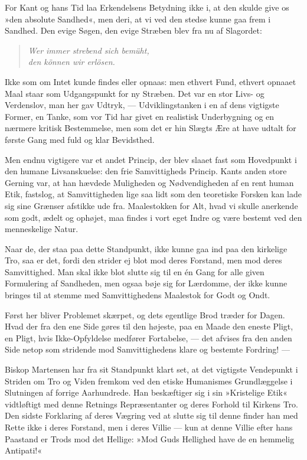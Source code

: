 \documentclass[12pt,a4paper]{article}
\newcommand{\apage}[1]{\marginnote{\footnotesize\textit{[#1]}}}
\begin{document}
For Kant og hans Tid laa Erkendelsens Betydning ikke i, at den skulde give
os »den absolute Sandhed«, men deri, at vi ved den stedse kunne gaa frem i
Sandhed. Den evige Søgen, den evige Stræben blev fra nu af Slagordet:

\begin{quote}
\itshape
Wer immer strebend sich bemüht,\\
den können wir erlösen.
\end{quote}

Ikke som om Intet kunde findes eller opnaas: men ethvert Fund, ethvert
opnaaet Maal staar som Udgangspunkt for ny Stræben. Det var en stor Livs-
og Verdenslov, man her gav Udtryk, --- Udviklingstanken i en af dens
vigtigste Former, en Tanke, som vor Tid har givet en realistisk Underbygning
og en nærmere kritisk Bestemmelse, men som det er hin Slægts Ære at have
udtalt for første Gang med fuld og klar Bevidsthed.

Men endnu vigtigere var et andet Princip, der blev slaaet fast som
Hovedpunkt i den humane Livsanskuelse: den frie Samvittigheds Princip.
Kants anden store Gerning var, at han hævdede Muligheden og Nødvendigheden
af en rent human Etik, fastslog, at Samvittigheden lige saa lidt som \apage{201} den
teoretiske Forsken kan lade sig sine Grænser afstikke ude fra. Maalestokken
for Alt, hvad vi skulle anerkende som godt, ædelt og ophøjet, maa findes i
vort eget Indre og være bestemt ved den menneskelige Natur.

Naar de, der staa paa dette Standpunkt, ikke kunne gaa ind paa den kirkelige
Tro, saa er det, fordi den strider ej blot mod deres Forstand, men mod deres
Samvittighed. Man skal ikke blot slutte sig til en én Gang for alle given
Formulering af Sandheden, men ogsaa bøje sig for Lærdomme, der ikke kunne
bringes til at stemme med Samvittighedens Maalestok for Godt og Ondt.

Først her bliver Problemet skærpet, og dets egentlige Brod træder for
Dagen. Hvad der fra den ene Side gøres til den højeste, paa en Maade den
eneste Pligt, en Pligt, hvis Ikke-Opfyldelse medfører Fortabelse, --- det
afvises fra den anden Side netop som stridende mod Samvittighedens klare og
bestemte Fordring! ---

Biskop Martensen har fra sit Standpunkt klart set, at det vigtigste
Vendepunkt i Striden om Tro og Viden fremkom ved den etiske Humanismes
Grundlæggelse i Slutningen af forrige Aarhundrede. Han beskæftiger sig i sin
»Kristelige Etik« vidtløftigt med denne Retnings Repræsentanter og deres
Forhold til Kirkens Tro. Den sidste Forklaring af deres Vægring ved at
slutte sig til denne finder han med Rette ikke i deres Forstand, men i deres
Villie --- kun at denne Villie efter hans Paastand er Trods mod det Hellige:
»Mod Guds Hellighed have de en hemmelig Antipati!«
\end{document}
